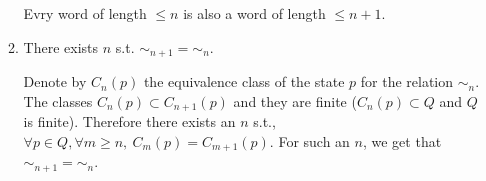 \documentclass[a4paper,11pt]{exam}
\begin{document}
\begin{questions}
\begin{enumerate}
\begin{enumerate}
          \begin{solution}
            Evry word of length $\leq n$ is also a word of length $\leq n+1$.
          \end{solution}

        \item There exists $n$ s.t. $\sim_{n+1} = \sim_{n}$.

          \begin{solution}
            Denote by $C_n(p)$ the equivalence class of the state $p$ for the relation $\sim_n$.
            The classes $C_n(p)\subset C_{n+1}(p)$ and they are finite ($C_n(p)\subset Q$ and $Q$ is finite).
            Therefore there exists an $n$ s.t., $\forall p \in Q,\forall m \geq n,~ C_m(p) = C_{m+1}(p)$. 
            For such an $n$,  we get that $\sim_{n+1} = \sim_n$.
          \end{solution}
      \end{enumerate}
   

\end{enumerate}
\end{questions}
\end{document}
